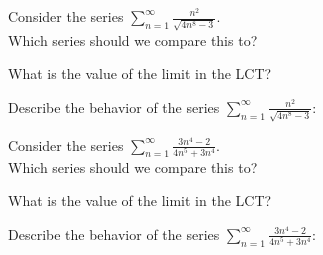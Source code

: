 \documentclass{ximera}
\begin{document}
\begin{problem}
Consider the series $\displaystyle{\sum_{n=1}^\infty \frac{n^2}{\sqrt{4n^8 - 3}}}$.\\
Which series should we compare this to?

\begin{multipleChoice}
\end{multipleChoice}

What is the value of the limit in the LCT?
\begin{multipleChoice}
\end{multipleChoice}

Describe the behavior of the series $\displaystyle{\sum_{n=1}^\infty \frac{n^2}{\sqrt{4n^8 - 3}}:}$
\begin{multipleChoice}
\end{multipleChoice}

\end{problem}




\begin{problem}
Consider the series $\displaystyle{\sum_{n=1}^\infty \frac{3n^4 -2}{4n^5 + 3n^4}}$.\\
Which series should we compare this to?

\begin{multipleChoice}
\end{multipleChoice}

What is the value of the limit in the LCT?
\begin{multipleChoice}
\end{multipleChoice}

Describe the behavior of the series $\displaystyle{\sum_{n=1}^\infty \frac{3n^4 -2}{4n^5 + 3n^4}:}$
\begin{multipleChoice}
\end{multipleChoice}

\end{problem}
\end{document}
